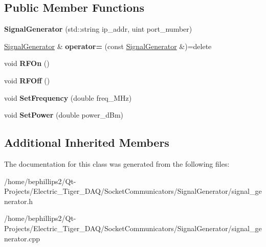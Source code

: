 \subsection*{Public Member Functions}
\begin{DoxyCompactItemize}
\item 
{\bfseries Signal\+Generator} (std\+::string ip\+\_\+addr, uint port\+\_\+number)\hypertarget{class_signal_generator_a8e6b4d36b320d50961f83761c5811567}{}\label{class_signal_generator_a8e6b4d36b320d50961f83761c5811567}

\item 
\hyperlink{class_signal_generator}{Signal\+Generator} \& {\bfseries operator=} (const \hyperlink{class_signal_generator}{Signal\+Generator} \&)=delete\hypertarget{class_signal_generator_a4ee427365a76d62d3645f707cf1baf72}{}\label{class_signal_generator_a4ee427365a76d62d3645f707cf1baf72}

\item 
void {\bfseries R\+F\+On} ()\hypertarget{class_signal_generator_a55fbb51b7bd6b3cef69689eb8a63f0f9}{}\label{class_signal_generator_a55fbb51b7bd6b3cef69689eb8a63f0f9}

\item 
void {\bfseries R\+F\+Off} ()\hypertarget{class_signal_generator_a2f277765a848fe7640fae5b3d79c1714}{}\label{class_signal_generator_a2f277765a848fe7640fae5b3d79c1714}

\item 
void {\bfseries Set\+Frequency} (double freq\+\_\+\+M\+Hz)\hypertarget{class_signal_generator_a9ad69641992a00ef027682d5391df8e8}{}\label{class_signal_generator_a9ad69641992a00ef027682d5391df8e8}

\item 
void {\bfseries Set\+Power} (double power\+\_\+d\+Bm)\hypertarget{class_signal_generator_a319e0ca196dd341b1aab276626a729f3}{}\label{class_signal_generator_a319e0ca196dd341b1aab276626a729f3}

\end{DoxyCompactItemize}
\subsection*{Additional Inherited Members}


The documentation for this class was generated from the following files\+:\begin{DoxyCompactItemize}
\item 
/home/bephillips2/\+Qt-\/\+Projects/\+Electric\+\_\+\+Tiger\+\_\+\+D\+A\+Q/\+Socket\+Communicators/\+Signal\+Generator/signal\+\_\+generator.\+h\item 
/home/bephillips2/\+Qt-\/\+Projects/\+Electric\+\_\+\+Tiger\+\_\+\+D\+A\+Q/\+Socket\+Communicators/\+Signal\+Generator/signal\+\_\+generator.\+cpp\end{DoxyCompactItemize}
